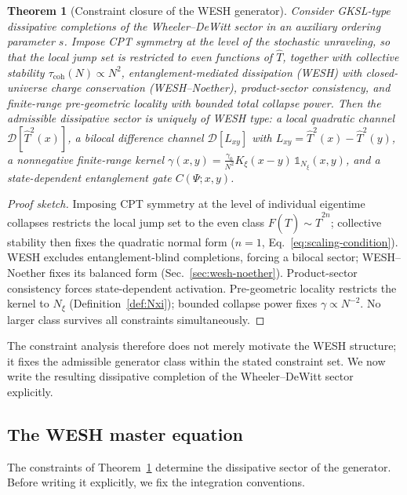 \documentclass[12pt,a4paper]{article}
\newtheorem{theorem}{Theorem}[section]
\numberwithin{equation}{section}
\begin{document}
\begin{theorem}[Constraint closure of the WESH generator]
\label{thm:constraint-closure}
Consider GKSL-type dissipative completions of the Wheeler--DeWitt sector in an auxiliary ordering parameter $s$. Impose CPT symmetry at the level of the stochastic unraveling, so that the local jump set is restricted to even functions of $\hat T$, together with collective stability $\tau_{\mathrm{coh}}(N) \propto N^2$, entanglement-mediated dissipation (WESH) with closed-universe charge conservation (WESH--Noether), product-sector consistency, and finite-range pre-geometric locality with bounded total collapse power. Then the admissible dissipative sector is uniquely of WESH type: a local quadratic channel $\mathcal{D}[\hat T^2(x)]$, a bilocal difference channel $\mathcal{D}[L_{xy}]$ with $L_{xy} = \hat T^2(x) - \hat T^2(y)$, a nonnegative finite-range kernel $\gamma(x,y) = \frac{\gamma_0}{N^2} K_\xi(x{-}y)\,\mathbb{1}_{N_\xi}(x,y)$, and a state-dependent entanglement gate $C(\Psi;x,y)$.
\end{theorem}

\begin{proof}[Proof sketch]
Imposing CPT symmetry at the level of individual eigentime collapses restricts the local jump set to the even class $F(\hat T)\sim \hat T^{2n}$; collective stability then fixes the quadratic normal form ($n = 1$, Eq.~\eqref{eq:scaling-condition}). WESH excludes entanglement-blind completions, forcing a bilocal sector; WESH--Noether fixes its balanced form (Sec.~\ref{sec:wesh-noether}). Product-sector consistency forces state-dependent activation. Pre-geometric locality restricts the kernel to $N_\xi$ (Definition~\ref{def:Nxi}); bounded collapse power fixes $\gamma \propto N^{-2}$. No larger class survives all constraints simultaneously.
\end{proof}

\noindent The constraint analysis therefore does not merely motivate the WESH structure; it fixes the admissible generator class within the stated constraint set. We now write the resulting dissipative completion of the Wheeler--DeWitt sector explicitly.

\subsection{The WESH master equation}

\vspace{0.5cm}

\noindent The constraints of Theorem~\ref{thm:constraint-closure} determine the dissipative sector of the 
generator. Before writing it explicitly, we fix the integration conventions.
\end{document}
